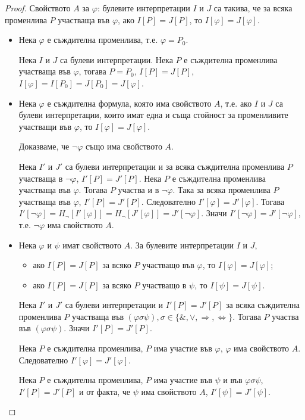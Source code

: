 \documentclass{article}
\begin{document}
\begin{claim}
\iffalse
\begin{proof}
Свойството $A$ за $\varphi$: булевите интерпретации $I$ и $J$ са такива, че за всяка променлива $P$ участваща във $\varphi$, ако $I[P] = J[P]$, то $I[\varphi] = J[\varphi]$.

\begin{itemize}
\item Нека $\varphi$ е съждителна променлива, т.е. $\varphi = P_0$.

Нека $I$ и $J$ са булеви интерпретации. Нека $P$ е съждителна променлива участваща във $\varphi$, тогава $P = P_0$, $I[P] = J[P]$, $I[\varphi] = I[P_0] = J[P_0] = J[\varphi]$.
\item Нека $\varphi$ е съждителна формула, която има свойството $A$, т.е. ако $I$ и $J$ са булеви интерпретации, които имат една и съща стойност за променливите участващи във $\varphi$, то $I[\varphi] = J[\varphi]$.

Доказваме, че $\neg\varphi$ също има свойството $A$.

Нека $I'$ и $J'$ са булеви интерпретации и за всяка съждителна променлива $P$ участваща в $\neg\varphi$, $I'[P] = J'[P]$. Нека $P$ е съждителна променлива участваща във $\varphi$. Тогава $P$ участва и в $\neg\varphi$. Така за всяка променлива $P$ участваща във $\varphi$, $I'[P] = J'[P]$. Следователно $I'[\varphi] = J'[\varphi]$. Тогава $I'[\neg\varphi] = H_{\neg}[I'[\varphi]] = H_{\neg}[J'[\varphi]] = J'[\neg\varphi]$. Значи $I'[\neg\varphi] = J'[\neg\varphi]$, т.е. $\neg\varphi$ има свойството $A$.
\item Нека $\varphi$ и $\psi$ имат свойството $A$. За булевите интерпретации $I$ и $J$, 
\begin{itemize}
\item ако $I[P] = J[P]$ за всяко $P$ участващо във $\varphi$, то $I[\varphi] = J[\varphi]$;
\item ако $I[P] = J[P]$ за всяко $P$ участващо в $\psi$, то $I[\psi] = J[\psi]$.
\end{itemize}
Нека $I'$ и $J'$ са булеви интерпретации и $I'[P] = J'[P]$ за всяка съждителна променлива $P$ участваща във $(\varphi \sigma \psi), \sigma \in \{\&, \lor, \Rightarrow, \Leftrightarrow\}$. Тогава $P$ участва във $(\varphi \sigma \psi)$. Значи $I'[P] = J'[P]$.

Нека $P$ е съждителна променлива, $P$ има участие във $\varphi$, $\varphi$ има свойството $A$. Следователно $I'[\varphi] = J'[\varphi]$.

Нека $P$ е съждителна променлива, $P$ има участие във $\psi$ и във $\varphi	\sigma \psi$, $I'[P] = J'[P]$ и от факта, че $\psi$ има свойството $A$, $I'[\psi] = J'[\psi]$. 


\end{itemize}
\end{proof}
\end{claim}
\end{document}
